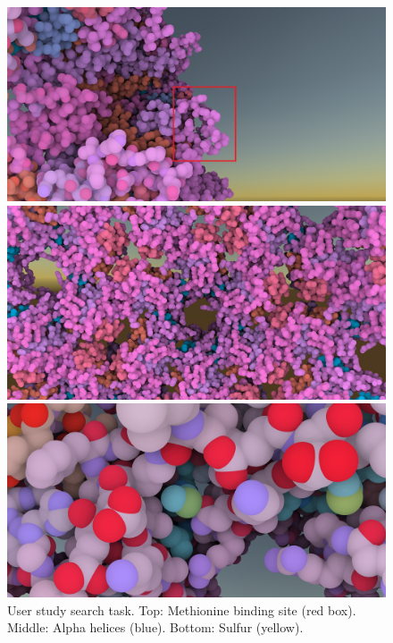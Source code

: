 \documentclass{article}
\begin{document}
	\begin{figure}[t]
		\centering
		\includegraphics[width=0.95\linewidth,keepaspectratio]{supplementaryMaterial/bindingsite} 
		
		\vspace{0.1cm}
		
		\includegraphics[width=0.95\linewidth,keepaspectratio]{supplementaryMaterial/hexamerhelices} 
		
		\vspace{0.1cm}
		
		\includegraphics[width=0.95\linewidth,keepaspectratio]{supplementaryMaterial/sulfur} 
		\caption{User study search task. Top: Methionine binding site (red box). Middle: Alpha helices (blue). Bottom: Sulfur (yellow).}
	\end{figure}
	
	
	
	
\end{document}
